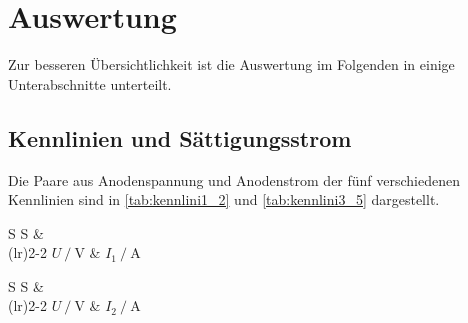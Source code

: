 \section{Auswertung}
\label{sec:auswertung}

Zur besseren Übersichtlichkeit ist die Auswertung im Folgenden in einige Unterabschnitte unterteilt.

\subsection{Kennlinien und Sättigungsstrom}

Die Paare aus Anodenspannung und Anodenstrom der fünf verschiedenen Kennlinien sind in \autoref{tab:kennlini1_2} und \autoref{tab:kennlini3_5} dargestellt.

\begin{table}[H]
    \centering
    \caption{Anodenstrom $I_1$ mit den dazugehörigen Anodenspannungen $U$.}
    \label{tab:kennlini1_2}
\begin{minipage}[c]{0.45\textwidth}
    \begin{tabular}{S S}
        \toprule
        &  \\
        \cmidrule(lr){2-2}
        {$U \mathbin{/} \unit{\volt}$} & {$I_1 \mathbin{/} \unit{\ampere}$} \\
        \midrule




        \bottomrule
    \end{tabular}
\end{minipage}
\begin{minipage}[c]{0.45\textwidth}
    \begin{tabular}{S S}
        \toprule
        &  \\
        \cmidrule(lr){2-2}
        {$U \mathbin{/} \unit{\volt}$} & {$I_2 \mathbin{/} \unit{\ampere}$} \\
        \midrule




        \bottomrule
    \end{tabular}
\end{minipage}
\end{table}
    



